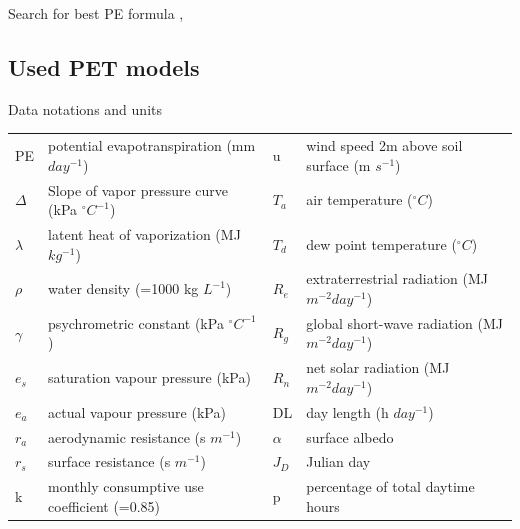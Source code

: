 \documentclass[hydrology,article,submit,moreauthors,pdftex]{Definitions/mdpi}
\begin{document}
Search for best PE formula \cite{jensen1990evapotranspiration}, \cite{xu2002cross}

\subsection{Used PET models}
Data notations and units \\
\begin{tabular}{llll}
	PE & potential evapotranspiration (mm $day^{-1}$) & u & wind speed 2m above soil surface (m $s^{-1}$) \\
	$\Delta$ & Slope of vapor pressure curve (kPa $^{\circ} C^{-1}$) & $T_a$ & air temperature ($^{\circ} C$) \\
	$\lambda$ & latent heat of vaporization (MJ $kg^{-1}$) & 	$T_d$ & dew point temperature ($^{\circ} C$) \\
	$\rho$ & water density (=1000 kg $L^{-1}$) & $R_e$ & extraterrestrial radiation (MJ $m^{-2}day^{-1}$) \\
	$\gamma$ & psychrometric constant (kPa $^{\circ} C^{-1}$) & $R_g$ & global short-wave radiation (MJ $m^{-2}day^{-1}$) \\
	$e_s$ & saturation vapour pressure (kPa) & $R_n$ & net solar radiation (MJ $m^{-2}day^{-1}$) \\
	$e_a$ & actual vapour pressure (kPa) & DL & day length (h $day^{-1}$) \\
	$r_a$ & aerodynamic resistance (s $m^{-1}$) & $\alpha$ & surface albedo \\
	$r_s$ & surface resistance (s $m^{-1}$) & $J_D$ & Julian day \\
	k & monthly consumptive use coefficient (=0.85) & p &  percentage of total daytime hours \\
\end{tabular}
\end{document}

